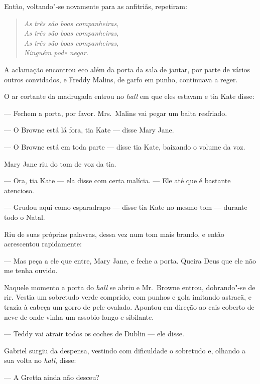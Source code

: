 Então, voltando"-se novamente para as anfitriãs, repetiram:

\begin{verse}\itshape
As três são boas companheiras,\\
As três são boas companheiras,\\\clearpage
As três são boas companheiras,\\
Ninguém pode negar.
\end{verse}

A aclamação encontrou eco além da porta da sala de jantar, por parte de vários
outros convidados, e Freddy Malins, de garfo em punho, continuava a reger.

\smallskip

\noindent\dotfill

\smallskip

O ar cortante da madrugada entrou no \textit{hall} em que eles estavam e tia
Kate disse:

--- Fechem a porta, por favor.  Mrs.~Malins vai pegar um baita resfriado.

--- O Browne está lá fora, tia Kate --- disse Mary Jane.

--- O Browne está em toda parte --- disse tia Kate, baixando o volume da voz.

Mary Jane riu do tom de voz da tia.

--- Ora, tia Kate --- ela disse com certa malícia.  --- Ele até que é bastante
atencioso.

--- Grudou aqui como esparadrapo --- disse tia Kate no mesmo tom --- durante
todo o Natal.

Riu de suas próprias palavras, dessa vez num tom mais brando, e então
acrescentou rapidamente:

--- Mas peça a ele que entre, Mary Jane, e feche a porta.  Queira Deus que ele
não me tenha ouvido.

Naquele momento a porta do \textit{hall} se abriu e Mr.~Browne entrou,
dobrando"-se de rir.  Vestia um sobretudo verde comprido, com punhos e gola
imitando astracã, e trazia à cabeça um gorro de pele ovalado.  Apontou em
direção ao cais coberto de neve de onde vinha um assobio longo e sibilante.

--- Teddy vai atrair todos os coches de Dublin --- ele disse.

Gabriel surgiu da despensa, vestindo com dificuldade o sobretudo e, olhando a
sua volta no \textit{hall}, disse:

--- A Gretta ainda não desceu?

